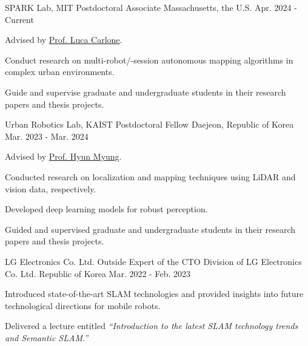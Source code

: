 

\begin{cventries}

  \cventry
    {SPARK Lab, MIT} %
    {Postdoctoral Associate} %
    {Massachusetts, the U.S.} %
    {Apr. 2024 - Current} %
    {
      \begin{cvitems} %
        \item Advised by \href{https://lucacarlone.mit.edu/}{Prof. Luca Carlone}.
        \item Conduct research on multi-robot/-session autonomous mapping algorithms in complex urban environments.
        \item Guide and supervise graduate and undergraduate students in their research papers and thesis projects.
      \end{cvitems}
    }

 \cventry
    {Urban Robotics Lab, KAIST} %
    {Postdoctoral Fellow} %
    {Daejeon, Republic of Korea} %
    {Mar. 2023 - Mar. 2024} %
    {
      \begin{cvitems} %
        \item Advised by \href{https://urobot.kaist.ac.kr/url_teams/prof-hyunmyung/}{Prof. Hyun Myung}.
        \item Conducted research on localization and mapping techniques using LiDAR and vision data, respectively.
        \item Developed deep learning models for robust perception.
        \item Guided and supervised graduate and undergraduate students in their research papers and thesis projects.
      \end{cvitems}
    }

  \cventry
    {LG Electronics Co. Ltd.} %
    {Outside Expert of the CTO Division of LG Electronics Co. Ltd.} %
    {Republic of Korea} %
    {Mar. 2022 - Feb. 2023} %
    {
      \begin{cvitems} %
        \item Introduced state-of-the-art SLAM technologies and provided insights into future technological directions for mobile robots.
        \item Delivered a lecture entitled \textit{``Introduction to the latest SLAM technology trends and Semantic SLAM.''}
      \end{cvitems}
    }


\end{cventries}
